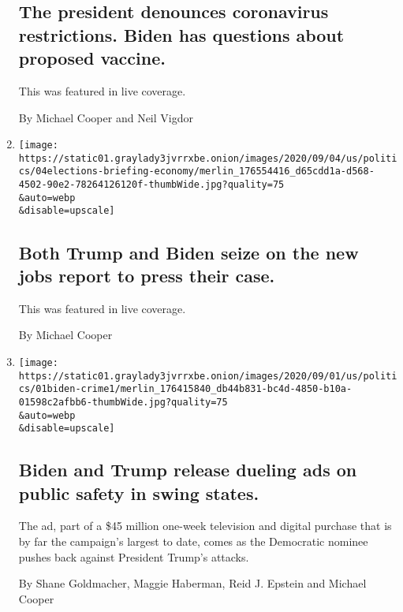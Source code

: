\begin{enumerate}
{  \subsection{The president denounces coronavirus restrictions. Biden
  has questions about proposed
  vaccine.}\label{the-president-denounces-coronavirus-restrictions-biden-has-questions-about-proposed-vaccine}}

  This was featured in live coverage.

  By Michael Cooper and Neil Vigdor
\item
  \href{/live/2020/09/04/us/trump-vs-biden/both-trump-and-biden-seize-on-the-new-jobs-report-to-press-their-case}{}

  \texttt{[image: https://static01.graylady3jvrrxbe.onion/images/2020/09/04/us/politics/04elections-briefing-economy/merlin\_176554416\_d65cdd1a-d568-4502-90e2-78264126120f-thumbWide.jpg?quality=75\\\&auto=webp\\\&disable=upscale]}

  \hypertarget{both-trump-and-biden-seize-on-the-new-jobs-report-to-press-their-case}{%
  \subsection{Both Trump and Biden seize on the new jobs report to press
  their
  case.}\label{both-trump-and-biden-seize-on-the-new-jobs-report-to-press-their-case}}

  This was featured in live coverage.

  By Michael Cooper
\item
  \href{/live/2020/09/02/us/trump-vs-biden/biden-and-trump-release-dueling-ads-on-public-safety-in-swing-states}{}

  \texttt{[image: https://static01.graylady3jvrrxbe.onion/images/2020/09/01/us/politics/01biden-crime1/merlin\_176415840\_db44b831-bc4d-4850-b10a-01598c2afbb6-thumbWide.jpg?quality=75\\\&auto=webp\\\&disable=upscale]}

  \hypertarget{biden-and-trump-release-dueling-ads-on-public-safety-in-swing-states}{%
  \subsection{Biden and Trump release dueling ads on public safety in
  swing
  states.}\label{biden-and-trump-release-dueling-ads-on-public-safety-in-swing-states}}

  The ad, part of a \$45 million one-week television and digital
  purchase that is by far the campaign's largest to date, comes as the
  Democratic nominee pushes back against President Trump's attacks.

  By Shane Goldmacher, Maggie Haberman, Reid J. Epstein and Michael
  Cooper
\end{enumerate}


